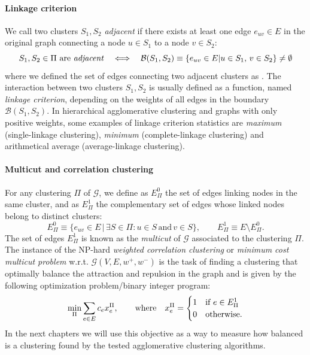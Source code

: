 \paragraph{Linkage criterion}\label{par:linkage_criterion_def} We call two clusters $S_1,S_2$ \emph{adjacent} if there exists at least one edge $e_{uv}\in E$ in the original graph connecting a node $u\in S_1$ to a node $v\in S_2$:
\begin{equation}
 \text{$S_1, S_2 \in \Pi$ are \emph{adjacent}} \quad \Longleftrightarrow  \quad  \mathcal{B}(S_1,S_2) \equiv \{ e_{uv} \in E | u \in S_1, \, v \in S_2 \} \neq \emptyset
\end{equation}
where we defined the set of edges connecting two adjacent clusters as  . The interaction between two clusters $S_1, S_2$ is usually defined as a function, named \emph{linkage criterion}, depending on the weights of all edges in the boundary $\mathcal{B}(S_1,S_2)$. In hierarchical agglomerative clustering and graphs with only positive weights, some examples of linkage criterion statistics are \emph{maximum} (single-linkage clustering), \emph{minimum} (complete-linkage clustering) and arithmetical average (average-linkage clustering).

\paragraph{Multicut and correlation clustering} For any clustering $\Pi$ of $\mathcal{G}$, we define as $E^0_\Pi$ the set of edges linking nodes in the same cluster, and as $E_\Pi^1$ the complementary set of edges whose linked nodes belong to distinct clusters:
\begin{equation}
E_\Pi^0 \equiv \{ e_{uv} \in E \,|\, \exists S \in \Pi : u \in S \, \text{and} \, v \in S \}, \qquad E^1_\Pi \equiv E \setminus E^0_\Pi.
\end{equation}
The set of edges $E_\Pi^1$ is known as the \emph{multicut} of $\mathcal{G}$ associated to the clustering $\Pi$. The instance of the NP-hard \emph{weighted correlation clustering} or \emph{minimum cost multicut problem} w.r.t. $\mathcal{G}(V,E,w^+, w^-)$ \cite{kappes2011globally,chopra1991multiway,andres2015lifting} is the task of finding a clustering that optimally balance the attraction and repulsion in the graph and is given by the following optimization problem/binary integer program:
\begin{equation}
 \min_\Pi \sum_{e\in E} c_e x_e^\Pi,  \qquad \text{where} \quad x^\Pi_e = 
 \begin{cases} 
 1 & \text{if } e\in E^1_\Pi \\
 0 & \text{otherwise}.
 \end{cases}
\end{equation}
In the next chapters we will use this objective as a way to measure how balanced is a clustering found by the tested agglomerative clustering algorithms.

